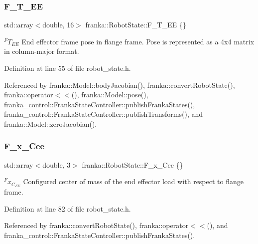 \subsubsection{\texorpdfstring{F\+\_\+\+T\+\_\+\+EE}{F\_T\_EE}}
{\footnotesize\ttfamily std\+::array$<$double, 16$>$ franka\+::\+Robot\+State\+::\+F\+\_\+\+T\+\_\+\+EE \{\}}

$^{F}T_{EE}$ End effector frame pose in flange frame. Pose is represented as a 4x4 matrix in column-\/major format. 

Definition at line 55 of file robot\+\_\+state.\+h.



Referenced by franka\+::\+Model\+::body\+Jacobian(), franka\+::convert\+Robot\+State(), franka\+::operator$<$$<$(), franka\+::\+Model\+::pose(), franka\+\_\+control\+::\+Franka\+State\+Controller\+::publish\+Franka\+States(), franka\+\_\+control\+::\+Franka\+State\+Controller\+::publish\+Transforms(), and franka\+::\+Model\+::zero\+Jacobian().

\mbox{\label{structfranka_1_1RobotState_a907c4561d8f1c1a2af7980cf58ceb112}} 
\subsubsection{\texorpdfstring{F\+\_\+x\+\_\+\+Cee}{F\_x\_Cee}}
{\footnotesize\ttfamily std\+::array$<$double, 3$>$ franka\+::\+Robot\+State\+::\+F\+\_\+x\+\_\+\+Cee \{\}}

$^{F}x_{C_{EE}}$ Configured center of mass of the end effector load with respect to flange frame. 

Definition at line 82 of file robot\+\_\+state.\+h.



Referenced by franka\+::convert\+Robot\+State(), franka\+::operator$<$$<$(), and franka\+\_\+control\+::\+Franka\+State\+Controller\+::publish\+Franka\+States().

\mbox{\label{structfranka_1_1RobotState_a48e921e6215ad32f36e424b4d7b66a89}} 
